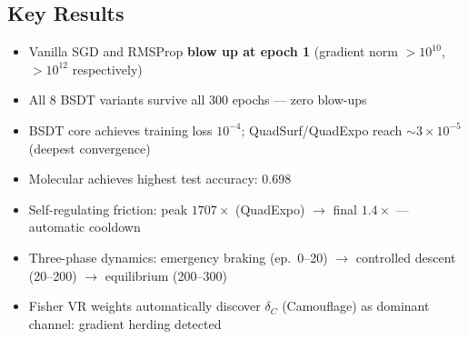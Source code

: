 \documentclass[11pt,a4paper]{article}
\begin{document}
\subsection{Key Results}
\begin{itemize}[nosep]
  \item Vanilla SGD and RMSProp \textbf{blow up at epoch 1}
        (gradient norm $> 10^{10}$, $> 10^{12}$ respectively)
  \item All 8 BSDT variants survive all 300 epochs --- zero blow-ups
  \item BSDT core achieves training loss $10^{-4}$; QuadSurf/QuadExpo
        reach $\sim 3 \times 10^{-5}$ (deepest convergence)
  \item Molecular achieves highest test accuracy: 0.698
  \item Self-regulating friction: peak $1707\times$ (QuadExpo)
        $\to$ final $1.4\times$ --- automatic cooldown
  \item Three-phase dynamics: emergency braking (ep.\ 0--20) $\to$
        controlled descent (20--200) $\to$ equilibrium (200--300)
  \item Fisher VR weights automatically discover $\delta_C$ (Camouflage)
        as dominant channel: gradient herding detected
\end{itemize}
\end{document}
